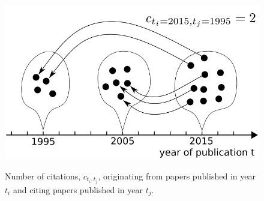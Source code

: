 \documentclass[draft,final]{vutinfth} %
\begin{document}
\begin{figure}[h!]
	\centering
	  \includegraphics[width=0.6\columnwidth]{figures_aps/1a.png}\\
		\caption{ 
		Number of citations, $c_{t_i,t_j}$, originating from papers published in year $t_i$ and citing papers published in year $t_j$.}
	\label{fig:aor}
\end{figure}
\end{document}
